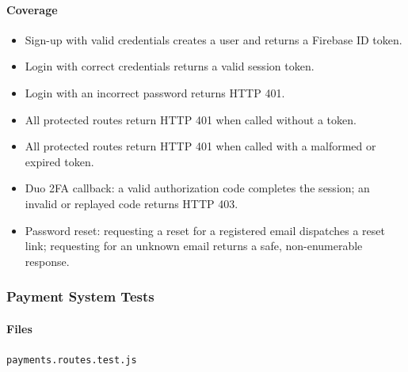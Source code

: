 \documentclass[11pt]{article}
\begin{document}
\paragraph{Coverage}
\begin{itemize}[leftmargin=1.4em]
  \item Sign-up with valid credentials creates a user and returns a Firebase ID token.
  \item Login with correct credentials returns a valid session token.
  \item Login with an incorrect password returns HTTP 401.
  \item All protected routes return HTTP 401 when called without a token.
  \item All protected routes return HTTP 401 when called with a malformed or expired token.
  \item Duo 2FA callback: a valid authorization code completes the session; an invalid or replayed code returns HTTP 403.
  \item Password reset: requesting a reset for a registered email dispatches a reset link; requesting for an unknown email returns a safe, non-enumerable response.
\end{itemize}

\subsubsection{Payment System Tests}

\paragraph{Files}
\texttt{payments.routes.test.js}
\end{document}

